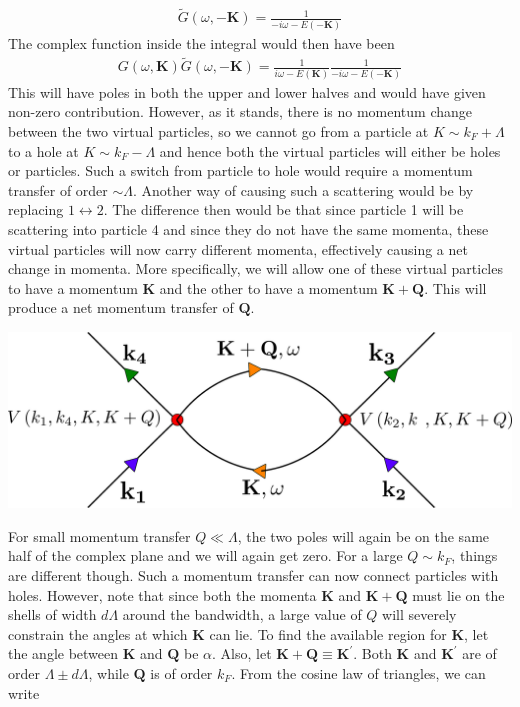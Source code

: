\documentclass[14pt]{extarticle}
\begin{document}
\begin{equation}\begin{aligned}
\tilde G(\omega,\mathbf{-K}) = \frac{1}{-i\omega - E(\mathbf{-K})}
\end{aligned}\end{equation}
The complex function inside the integral would then have been
\begin{equation}\begin{aligned}
\label{prop}
G(\omega,\mathbf{K})\tilde G(\omega,\mathbf{-K}) = \frac{1}{i\omega - E(\mathbf{K})}\frac{1}{-i\omega - E(\mathbf{-K})}
\end{aligned}\end{equation}
This will have poles in both the upper and lower halves and would have given non-zero contribution. However, as it stands, there is no momentum change between the two virtual particles, so we cannot go from a particle at \(K \sim k_F + \Lambda\) to a hole at \(K \sim k_F - \Lambda\) and hence both the virtual particles will either be holes or particles. Such a switch from particle to hole would require a momentum transfer of order \(\sim \Lambda\).
Another way of causing such a scattering would be by replacing \(1 \leftrightarrow 2\). The difference then would be that since particle 1 will be scattering into particle 4 and since they do not have the same momenta, these virtual particles will now carry different momenta, effectively causing a net change in momenta. More specifically, we will allow one of these virtual particles to have a momentum \(\mathbf{K}\) and the other to have a momentum \(\mathbf{K+Q}\). This will produce a net momentum transfer of \(\mathbf{Q}\).
\begin{center}
\includegraphics[scale=0.3]{./figures/term4.png}
\end{center}
For small momentum transfer \(Q \ll \Lambda\), the two poles will again be on the same half of the complex plane and we will again get zero. For a large \(Q \sim k_F\), things are different though. Such a momentum transfer can now connect particles with holes. However, note that since both the momenta \(\mathbf{K}\) and \(\mathbf{K}+\mathbf{Q}\) must lie on the shells of width \(d\Lambda\) around the bandwidth, a large value of \(Q\) will severely constrain the angles at which \(\mathbf{K}\) can lie. To find the available region for \(\mathbf{K}\), let the angle between \(\mathbf{K}\) and \(\mathbf{Q}\) be \(\alpha\). Also, let \(\mathbf{K}+\mathbf{Q}\equiv\mathbf{K}^\prime\). Both \(\mathbf{K}\) and \(\mathbf{K}^\prime\) are of order \(\Lambda \pm d\Lambda\), while \(\mathbf{Q}\)  is of order \(k_F\). From the cosine law of triangles, we can write
\end{document}
